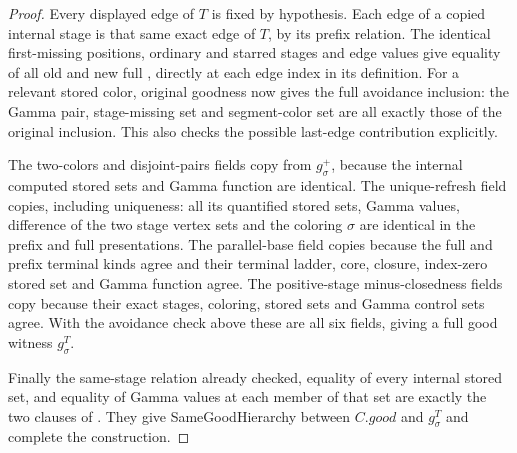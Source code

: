 \begin{proof}
Every displayed edge of $T$ is fixed by hypothesis. Each edge of a copied
internal stage is that same exact edge of $T$, by its prefix relation.
The identical first-missing positions, ordinary and starred stages and
edge values give equality of all old and new full
, directly at each edge index in its
definition. For a relevant stored color, original goodness now gives
the full avoidance inclusion: the Gamma pair, stage-missing set and
segment-color set are all exactly those of the original inclusion.
This also checks the possible last-edge contribution explicitly.

The two-colors and disjoint-pairs fields copy from $g^+_\sigma$, because
the internal computed stored sets and Gamma function are identical.
The unique-refresh field copies, including uniqueness: all its quantified
stored sets, Gamma values, difference of the two stage vertex sets and
the coloring $\sigma$ are identical in the prefix and full presentations.
The parallel-base field copies because the full and prefix terminal
kinds agree and their terminal ladder, core, closure, index-zero stored
set and Gamma function agree. The positive-stage minus-closedness fields
copy because their exact stages, coloring, stored sets and Gamma control
sets agree. With the avoidance check above these are all six fields,
giving a full good witness $g^T_\sigma$.

Finally the same-stage relation already checked, equality of every internal
stored set, and equality of Gamma values at each member of that set are
exactly the two clauses of . They give
SameGoodHierarchy between $C.\mathit{good}$ and $g^T_\sigma$ and complete
the construction.
\end{proof}
